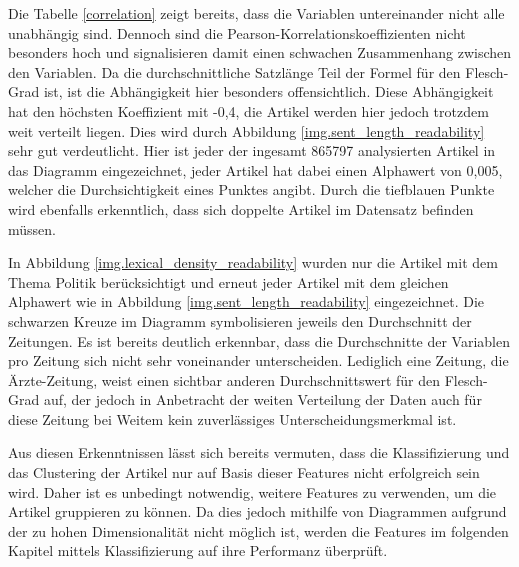 
Die Tabelle \ref{correlation} zeigt bereits, dass die Variablen untereinander nicht alle unabhängig sind. Dennoch sind die Pearson-Korrelationskoeffizienten nicht besonders hoch und signalisieren damit einen schwachen Zusammenhang zwischen den Variablen. Da die durchschnittliche Satzlänge Teil der Formel für den Flesch-Grad ist, ist die Abhängigkeit hier besonders offensichtlich. Diese Abhängigkeit hat den höchsten Koeffizient mit -0,4, die Artikel werden hier jedoch trotzdem weit verteilt liegen. Dies wird durch Abbildung \ref{img.sent_length_readability} sehr gut verdeutlicht. Hier ist jeder der ingesamt 865797 analysierten Artikel in das Diagramm eingezeichnet, jeder Artikel hat dabei einen Alphawert von 0,005, welcher die Durchsichtigkeit eines Punktes angibt. Durch die tiefblauen Punkte wird ebenfalls erkenntlich, dass sich doppelte Artikel im Datensatz befinden müssen.


In Abbildung \ref{img.lexical_density_readability} wurden nur die Artikel mit dem Thema Politik berücksichtigt und erneut jeder Artikel mit dem gleichen Alphawert wie in Abbildung \ref{img.sent_length_readability} eingezeichnet. Die schwarzen Kreuze im Diagramm symbolisieren jeweils den Durchschnitt der Zeitungen. Es ist bereits deutlich erkennbar, dass die Durchschnitte der Variablen pro Zeitung sich nicht sehr voneinander unterscheiden. Lediglich eine Zeitung, die Ärzte-Zeitung, weist einen sichtbar anderen Durchschnittswert für den Flesch-Grad auf, der jedoch in Anbetracht der weiten Verteilung der Daten auch für diese Zeitung bei Weitem kein zuverlässiges Unterscheidungsmerkmal ist.

Aus diesen Erkenntnissen lässt sich bereits vermuten, dass die Klassifizierung und das Clustering der Artikel nur auf Basis dieser Features nicht erfolgreich sein wird. Daher ist es unbedingt notwendig, weitere Features zu verwenden, um die Artikel gruppieren zu können. Da dies jedoch mithilfe von Diagrammen aufgrund der zu hohen Dimensionalität nicht möglich ist, werden die Features im folgenden Kapitel mittels Klassifizierung auf ihre Performanz überprüft.

